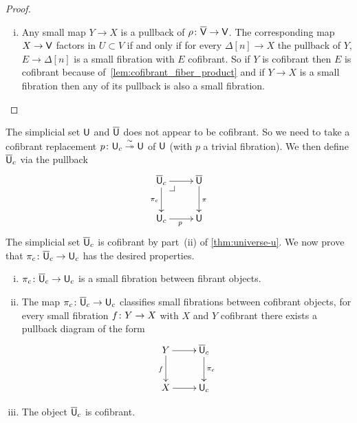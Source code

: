 \documentclass[reqno,10pt,a4paper,oneside,draft]{amsart}
\begin{document}
\begin{proof}
\begin{enumerate}[(i)]
\item Any small map $Y \rightarrow X$ is a pullback of $\rho \colon \overline{\mathsf{V}} \rightarrow \mathsf{V}$. The corresponding map $X \rightarrow \mathsf{V}$ factors in $U \subset V$ if and only if for every $\Delta[n] \rightarrow X$ the pullback of $Y$, $E \rightarrow \Delta[n]$ is a small fibration with $E$ cofibrant. So if $Y$ is cofibrant then $E$ is cofibrant because of~\cref{lem:cofibrant_fiber_product} and if $Y \rightarrow X$ is a small fibration then any of its pullback is also a small fibration.  \qedhere
\end{enumerate}
\end{proof} 



The simplicial set $\mathsf{U}$ and $\overline{\mathsf{U}}$ does not appear to be cofibrant. So we need to take a cofibrant replacement $p \colon \mathsf{U}_c \overset{\sim}{\twoheadrightarrow} \mathsf{U}$ of $\mathsf{U}$ (with $p$ a trivial fibration). 
We then define $\overline{\mathsf{U}}_c$ via the pullback
\[
\xymatrix{
\UU_c \ar[d]_{\pi_c} \ar[r] \drpullback & \UU \ar[d]^{\pi}  \\
\U_c \ar[r]_p & \U}
\]
The simplicial set $\overline{\mathsf{U}}_c$ is cofibrant by part~(ii) of \cref{thm:universe-u}.  We now prove that $\pi_c \colon \overline{\mathsf{U}}_c \to \mathsf{U}_c$ has the desired properties.


\begin{proposition} \label{thm:universe-uc} 
\hfill 
\begin{enumerate}[(i)] 
\item $\pi_c \colon \overline{\mathsf{U}}_c \to \mathsf{U}_c$ is a small fibration between fibrant objects. 
\item The map $\pi_c \colon \overline{\mathsf{U}}_c \to \mathsf{U}_c$ classifies small fibrations between cofibrant objects, \ie 
for every small fibration $f \colon Y \to X$ with $X$ and $Y$ cofibrant there exists a pullback diagram of the form
\[
\xymatrix{
Y \ar[r] \ar[d]_f & \UU_c \ar[d]^{\pi_c} \\
X \ar[r] & \U_c }
\]
\item The object $\overline{\mathsf{U}}_c$ is cofibrant. 
\end{enumerate}
\end{proposition}
\end{document}
